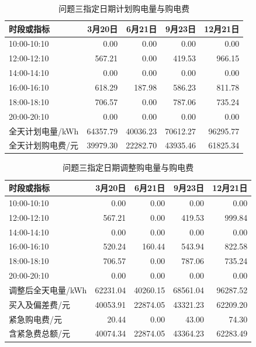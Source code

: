 \begin{table}[htbp]\centering
\caption{问题三指定日期计划购电量与购电费}\label{tab:q3buy}
\small
\begin{tabular}{lrrrr}
\toprule
时段或指标 & 3月20日 & 6月21日 & 9月23日 & 12月21日 \\
\midrule
10:00-10:10 & 0.00 & 0.00 & 0.00 & 0.00 \\
12:00-12:10 & 567.21 & 0.00 & 419.53 & 966.15 \\
14:00-14:10 & 0.00 & 0.00 & 0.00 & 0.00 \\
16:00-16:10 & 618.29 & 187.98 & 586.23 & 811.78 \\
18:00-18:10 & 706.57 & 0.00 & 787.06 & 735.24 \\
20:00-20:10 & 0.00 & 0.00 & 0.00 & 0.00 \\
全天计划电量/kWh & 64357.79 & 40036.23 & 70612.27 & 96295.77 \\
全天计划购电费/元 & 39979.30 & 22282.70 & 43935.46 & 61825.34 \\
\bottomrule
\end{tabular}
\end{table}
\begin{table}[htbp]\centering
\caption{问题三指定日期调整购电量与购电费}\label{tab:q3adj}
\small
\begin{tabular}{lrrrr}
\toprule
时段或指标 & 3月20日 & 6月21日 & 9月23日 & 12月21日 \\
\midrule
10:00-10:10 & 0.00 & 0.00 & 0.00 & 0.00 \\
12:00-12:10 & 567.21 & 0.00 & 419.53 & 999.84 \\
14:00-14:10 & 0.00 & 0.00 & 0.00 & 0.00 \\
16:00-16:10 & 520.24 & 160.44 & 543.94 & 822.58 \\
18:00-18:10 & 706.57 & 0.00 & 787.06 & 735.24 \\
20:00-20:10 & 0.00 & 0.00 & 0.00 & 0.00 \\
调整后全天电量/kWh & 62231.04 & 40260.15 & 68561.04 & 96287.52 \\
买入及偏差费/元 & 40053.91 & 22874.05 & 43321.23 & 62209.20 \\
紧急购电费/元 & 20.44 & 0.00 & 43.00 & 74.30 \\
含紧急费总额/元 & 40074.34 & 22874.05 & 43364.23 & 62283.49 \\
\bottomrule
\end{tabular}
\end{table}
